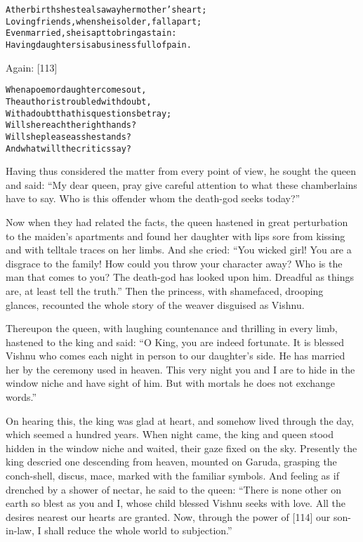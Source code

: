 \documentclass{article}
\renewenvironment{verbatim}{\begin{alltt}\normalfont\begin{centering}}{\end{centering}\end{alltt}}
\begin{document}
\begin{verbatim}
At her birth she steals away her mother's heart;
Loving friends, when she is older, fall apart;
Even married, she is apt to bring a stain:
Having daughters is a business full of pain.
\end{verbatim}
Again: [113]

\begin{verbatim}
When a poem or daughter comes out,
The author is troubled with doubt,
    With a doubt that his questions betray;
Will she reach the right hands?
Will she please as she stands?
    And what will the critics say?
\end{verbatim}
Having thus considered the matter from every point of view, he
sought the queen and said:
``My dear queen, pray give careful attention to what these chamberlains have to say. Who is this offender whom the death-god seeks today?''

Now when they had related the facts, the queen hastened in great
perturbation to the maiden's apartments and found her daughter with
lips sore from kissing and with telltale traces on her limbs. And
she cried:
``You wicked girl! You are a disgrace to the family! How could you throw your character away? Who is the man that comes to you? The death-god has looked upon him. Dreadful as things are, at least tell the truth.''
Then the princess, with shamefaced, drooping glances, recounted the
whole story of the weaver disguised as Vishnu.

Thereupon the queen, with laughing countenance and thrilling in
every limb, hastened to the king and said:
``O King, you are indeed fortunate. It is blessed Vishnu who comes each night in person to our daughter's side. He has married her by the ceremony used in heaven. This very night you and I are to hide in the window niche and have sight of him. But with mortals he does not exchange words.''

On hearing this, the king was glad at heart, and somehow lived
through the day, which seemed a hundred years. When night came, the
king and queen stood hidden in the window niche and waited, their
gaze fixed on the sky. Presently the king descried one descending
from heaven, mounted on Garuda, grasping the conch-shell, discus,
mace, marked with the familiar symbols. And feeling as if drenched
by a shower of nectar, he said to the queen:
``There is none other on earth so blest as you and I, whose child blessed Vishnu seeks with love. All the desires nearest our hearts are granted. Now, through the power of [114] our son-in-law, I shall reduce the whole world to subjection.''
\end{document}
